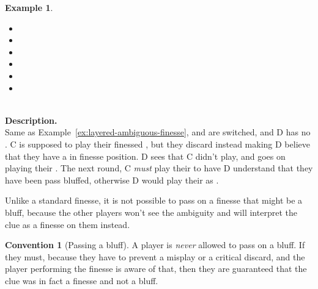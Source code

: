 \documentclass[a4paper]{article}
\theoremstyle{plain}
\theoremstyle{definition}
\newtheorem{example}[theorem]{Example}
\newtheorem{convention}[theorem]{Convention}
\begin{document}
\begin{example}	\hfill \\
	\begin{minipage}{0.45\textwidth}
		\begin{itemize}
			\item[\Large +]      
			\item[\Large A]    
			\item[\Large B]    
			\item[\Large C]     
			\item[\Large D]    
			\item[\Large E]    
		\end{itemize}
	\end{minipage}%
	\begin{minipage}{0.55\textwidth}
		\hfill \\
		
		\textbf{Description.} \\
		
		Same as Example~\ref{ex:layered-ambiguous-finesse},  and  are switched, and D has no . C is supposed to play their finessed , but they discard instead making D believe that they have a  in finesse position. D sees that C didn't play, and goes on playing their . The next round, C \emph{must} play their  to have D understand that they have been pass bluffed, otherwise D would play their  as .
	\end{minipage}
\end{example} \vspace{0.15 cm}

Unlike a standard finesse, it is not possible to pass on a finesse that might be a bluff, because the other players won't see the ambiguity and will interpret the clue as a finesse on them instead.

\begin{convention}[Passing a bluff]
	A player is \emph{never} allowed to pass on a bluff. If they must, because they have to prevent a misplay or a critical discard, and the player performing the finesse is aware of that, then they are guaranteed that the clue was in fact a finesse and not a bluff.
\end{convention}
\end{document}
